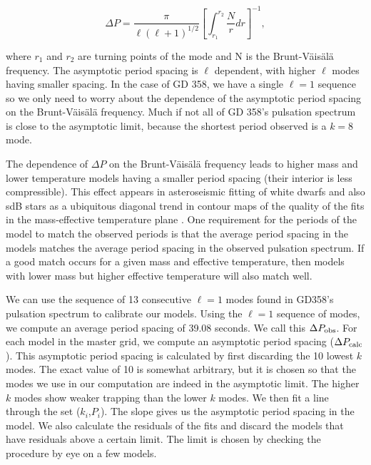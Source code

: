 \documentclass[12pt,preprint]{aastex}
\newcommand{\bvf}{Brunt-V\"ais\"al\"a }
\begin{document}
\begin{equation}
\label{fiteq2}
\Delta P = \frac{\pi}{\ell(\ell + 1)^{1/2}}\left[\int_{r_1}^{r_2}\frac{N}{r}dr\right]^{-1},
\end{equation}

\noindent
where $r_1$ and $r_2$ are turning points of the mode and N is the Brunt-V\"{a}is\"{a}l\"{a} frequency. 
The asymptotic period spacing is $\ell$ dependent, with higher $\ell$ modes having smaller spacing. 
In the case of GD 358, we have a single $\ell=1$ sequence so we only need to worry about the dependence 
of the asymptotic period spacing on the \bvf frequency. Much if not all of GD 358's pulsation 
spectrum is close to the asymptotic limit, because the shortest period observed is a $k=8$ mode.

The dependence of $\Delta P$ on the \bvf frequency leads to higher mass and lower temperature models 
having a smaller period spacing (their interior is less compressible). This effect appears in asteroseismic 
fitting of white dwarfs and also sdB stars as a ubiquitous diagonal trend in contour maps of the quality 
of the fits in the mass-effective temperature plane \citep[e.g][]{Bischoff-Kim14,Castanheira09,Charpinet08}. 
One requirement for the periods of the model to match the observed periods is that the average period spacing 
in the models matches the average period spacing in the observed pulsation spectrum. If a good match occurs 
for a given mass and effective temperature, then models with lower mass but higher effective temperature 
will also match well.

We can use the sequence of 13 consecutive $\ell=1$ modes found in GD358's pulsation spectrum to calibrate our models. 
Using the $\ell=1$ sequence of modes, we compute an average period spacing of 39.08 seconds. We call 
this $\Delta P_{\rm obs}$. For each model in the master grid, we compute an asymptotic period spacing 
($\Delta P_{\rm calc}$). This asymptotic period spacing is calculated by first discarding the 10 lowest $k$ modes. The exact value of 10 is somewhat arbitrary, but it is chosen so that the modes we use in 
our computation are indeed in the asymptotic limit. The higher $k$ modes show weaker trapping than the 
lower $k$ modes. We then fit a line through the set ($k_i$,$P_i$). The slope gives us the asymptotic 
period spacing in the model. We also calculate the residuals of the fits and discard the models that have residuals above a certain limit. The limit is chosen by checking the procedure 
by eye on a few models. 
\end{document}
